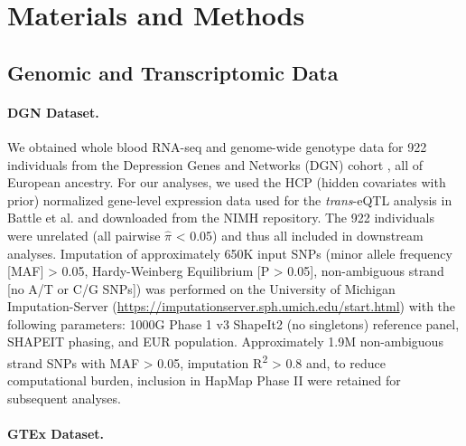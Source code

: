 \documentclass[10pt,letterpaper]{article}
\begin{document}
\section*{Materials and Methods}
\subsection*{Genomic and Transcriptomic
Data}\label{genomic-and-transcriptomic-data}

\paragraph*{DGN Dataset.}\label{dgn-dataset}

We obtained whole blood RNA-seq and genome-wide genotype data for 922
individuals from the Depression Genes and Networks (DGN) cohort
\cite{Battle_2013}, all of European ancestry. For our analyses, we used the HCP
(hidden covariates with prior) normalized gene-level expression data
used for the \emph{trans}-eQTL analysis in Battle et al. \cite{Battle_2013} and
downloaded from the NIMH repository. The 922 individuals were unrelated
(all pairwise \(\hat{\pi}\) \textless{} 0.05) and thus all included in
downstream analyses. Imputation of approximately 650K input SNPs (minor
allele frequency {[}MAF{]} \textgreater{} 0.05, Hardy-Weinberg
Equilibrium {[}P \textgreater{} 0.05{]}, non-ambiguous strand {[}no A/T
or C/G SNPs{]}) was performed on the University of Michigan
Imputation-Server
(\url{https://imputationserver.sph.umich.edu/start.html}) \cite{Howie_2012,Fuchsberger_2014}
with the following parameters: 1000G Phase 1 v3 ShapeIt2 (no singletons)
reference panel, SHAPEIT phasing, and EUR population. Approximately 1.9M
non-ambiguous strand SNPs with MAF \textgreater{} 0.05, imputation
R\textsuperscript{2} \textgreater{} 0.8 and, to reduce computational
burden, inclusion in HapMap Phase II were retained for subsequent
analyses.

\paragraph*{GTEx Dataset.}\label{gtex-dataset}
\end{document}
